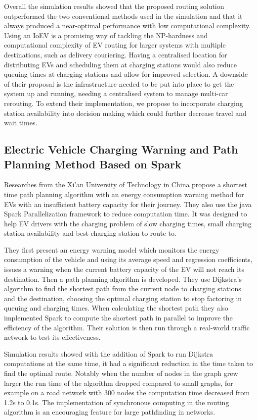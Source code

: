 \documentclass[11pt]{report}
\begin{document}
Overall the simulation results showed that the proposed routing solution outperformed the two conventional methods used in the simulation and that it always produced a near-optimal performance with low computational complexity. Using an IoEV is a promising way of tackling the NP-hardness and computational complexity of EV routing for larger systems with multiple destinations, such as delivery couriering. Having a centralised location for distributing EVs and scheduling them at charging stations would also reduce queuing times at charging stations and allow for improved selection. A downside of their proposal is the infrastructure needed to be put into place to get the system up and running, needing a centralised system to manage multi-car rerouting. To extend their implementation, we propose to incorporate charging station availability into decision making which could further decrease travel and wait times.

\subsection{Electric Vehicle Charging Warning and Path Planning Method Based on Spark \autocite{sparkEVChargingDing}}

Researches from the Xi’an University of Technology in China propose a shortest time path planning algorithm with an energy consumption warning method for EVs with an insufficient battery capacity for their journey. They also use the java Spark Parallelization framework \autocite{spark} to reduce computation time. It was designed to help EV drivers with the charging problem of slow charging times, small charging station availability and best charging station to route to.

They first present an energy warning model which monitors the energy consumption of the vehicle and using its average speed and regression coefficients, issues a warning when the current battery capacity of the EV will not reach its destination. Then a path planning algorithm is developed. They use Dijkstra's algorithm to find the shortest path from the current node to charging stations and the destination, choosing the optimal charging station to stop factoring in queuing and charging times. When calculating the shortest path they also implemented Spark to compute the shortest path in parallel to improve the efficiency of the algorithm. Their solution is then run through a real-world traffic network to test its effectiveness.

Simulation results showed with the addition of Spark to run Dijkstra computations at the same time, it had a significant reduction in the time taken to find the optimal route. Notably when the number of nodes in the graph grew larger the run time of the algorithm dropped compared to small graphs, for example on a road network with 300 nodes the computation time decreased from 1.2s to 0.1s. The implementation of synchronous computing in the routing algorithm is an encouraging feature for large pathfinding in networks.
\end{document}
